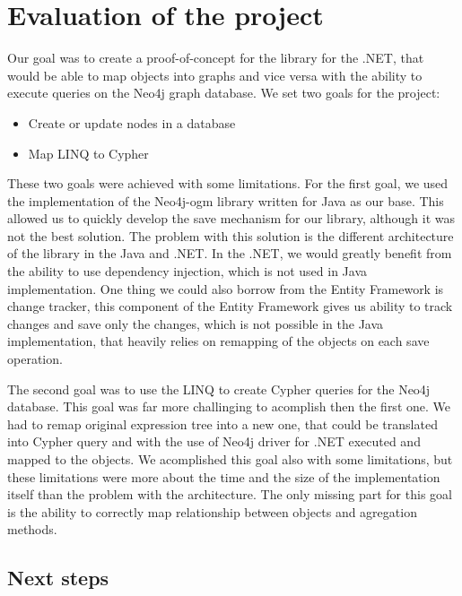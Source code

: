 \chapter{Evaluation of the project}

Our goal was to create a proof-of-concept for the library for the .NET, that would be able to map objects into graphs and vice versa
with the ability to execute queries on the Neo4j graph database. We set two goals for the project:
\begin{itemize}
    \item {Create or update nodes in a database}
    \item {Map LINQ to Cypher}
\end{itemize}

These two goals were achieved with some limitations. For the first goal, we used the implementation of the Neo4j-\acrshort{ogm} library written for Java
as our base. This allowed us to quickly develop the save mechanism for our library, although it was not the best solution. The problem with this solution
is the different architecture of the library in the Java and .NET. In the .NET, we would greatly benefit from the ability to use dependency injection, which is not
used in Java implementation. One thing we could also borrow from the Entity Framework is change tracker, this component of the Entity Framework gives us ability
to track changes and save only the changes, which is not possible in the Java implementation, that heavily relies on remapping of the objects on each save operation.

The second goal was to use the LINQ to create Cypher queries for the Neo4j database. This goal was far more challinging to acomplish then the first one.
We had to remap original expression tree into a new one, that could be translated into Cypher query and with the use of Neo4j driver for .NET executed and
mapped to the objects. We acomplished this goal also with some limitations, but these limitations were more about the time and the size of the implementation itself than
the problem with the architecture. The only missing part for this goal is the ability to correctly map relationship between objects and agregation methods.

\section{Next steps}

